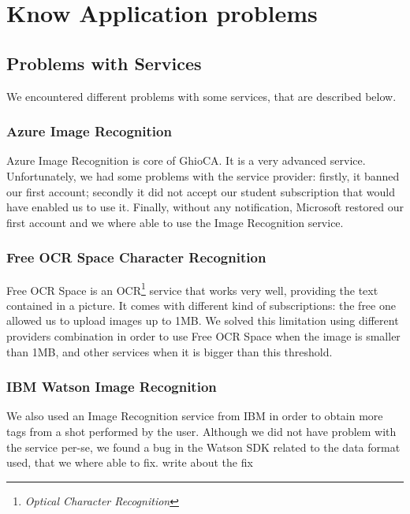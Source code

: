 \section{Know Application problems}

\subsection{Problems with Services}

We encountered different problems with some services, that are described below.

\subsubsection{Azure Image Recognition}

Azure Image Recognition is core of GhioCA. It is a very advanced service.
Unfortunately, we had some problems with the service provider: firstly,
it banned our first account; secondly it did not accept our student
subscription that would have enabled us to use it.
Finally, without any notification, Microsoft restored our first account and we
where able to use the Image Recognition service.

\subsubsection{Free OCR Space Character Recognition}

Free OCR Space is an OCR\footnote{\textit{Optical Character 
Recognition}} service that works very well, providing the text contained in a 
picture.
It comes with different kind of subscriptions: the free one allowed us to upload
images up to 1MB. 
We solved this limitation using different providers combination in order to use
Free OCR Space when the image is smaller than 1MB, and other services 
when it is bigger than this threshold.

\subsubsection{IBM Watson Image Recognition}

We also used an Image Recognition service from IBM in order to obtain more tags
from a shot performed by the user. %
Although we did not have problem with the service per-se, we found a bug in the 
Watson SDK related to the data format used, that we where able to fix. %
write about the fix

